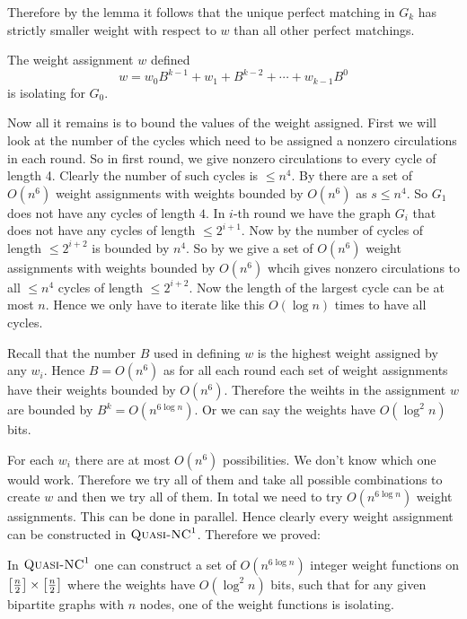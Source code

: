Therefore by the lemma it follows that the unique perfect matching in $G_k$ has strictly smaller weight with respect to $w$ than all other perfect matchings.
\begin{corolary}{}{}
	The weight assignment $w$ defined  $$w=w_0B^{k-1}+w_1+B^{k-2}+\cdots +w_{k-1}B^0$$ is isolating for $G_0$.
\end{corolary}

Now all it remains is to bound the values of the weight assigned. First we will look at the number of the cycles which need to be assigned a nonzero circulations in each round. So in first round, we give nonzero circulations to every cycle of length 4. Clearly the number of such cycles is $\leq n^4$. By  there are a set of $O(n^6)$ weight assignments with weights bounded by $O(n^6)$ as $s\leq n^4$. So $G_1$ does not have any cycles of length $4$. In $i$-th round we have the graph $G_i$ that does not have any cycles of length $\leq 2^{i+1}$. Now by  the number of cycles of length $\leq 2^{i+2}$ is bounded by $n^4$. So by  we give a set of $O(n^6)$ weight assignments with weights bounded by $O(n^6)$ whcih gives nonzero circulations to all $\leq n^4$ cycles of length $\leq 2^{i+2}$. Now the length of the largest cycle can be at most $n$. Hence we only have to iterate like this $O(\log n)$ times to have all cycles.

Recall that the number $B$ used in defining $w$ is the highest weight assigned by any $w_i$. Hence $B=O(n^6)$ as for all each round each set of weight assignments have their weights bounded by $O(n^6)$. Therefore the weihts in the assignment $w$ are bounded by $B^k=O(n^{6\log n})$. Or we can say the weights have $O(\log^2n)$ bits.

For each $w_i$ there are at most $O(n^6)$ possibilities. We don't know which one would work. Therefore we try all of them and take all possible combinations to create $w$ and then we try all of them. In total we need to try $O(n^{6\log n})$ weight assignments. This can be done in parallel. Hence clearly every weight assignment can be constructed in $\textsc{Quasi-NC}^1$. Therefore we proved:
\begin{Theorem}{\cite[Lemma 3.7]{FennerGurjarThierauf_2016_Bpm_CONF}}{}
	In $\textsc{Quasi-NC}^1$ one can construct a set of $O(n^{6\log n})$ integer weight functions on $\left[\frac{n}{2}\right]\times \left[\frac{n}2\right]$ where the weights have $O(\log ^2 n)$ bits, such that for any given bipartite graphs with $n$ nodes, one of the weight functions is isolating.
\end{Theorem}

